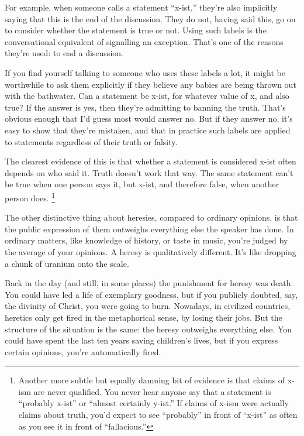 \documentclass[12pt]{book}
\begin{document}
For example, when someone calls a statement ``x-ist,'' they're also
implicitly saying that this is the end of the discussion. They do not,
having said this, go on to consider whether the statement is true or
not. Using such labels is the conversational equivalent of signalling an
exception. That's one of the reasons they're used: to end a discussion.

If you find yourself talking to someone who uses these labels a lot, it
might be worthwhile to ask them explicitly if they believe any babies
are being thrown out with the bathwater. Can a statement be x-ist, for
whatever value of x, and also true? If the answer is yes, then they're
admitting to banning the truth. That's obvious enough that I'd guess
most would answer no. But if they answer no, it's easy to show that
they're mistaken, and that in practice such labels are applied to
statements regardless of their truth or falsity.

The clearest evidence of this is that whether a statement is considered
x-ist often depends on who said it. Truth doesn't work that way. The
same statement can't be true when one person says it, but x-ist, and
therefore false, when another person does. \footnote{Another more subtle but equally damning bit of evidence is that
claims of x-ism are never qualified. You never hear anyone say that a
statement is ``probably x-ist'' or ``almost certainly y-ist.'' If claims
of x-ism were actually claims about truth, you'd expect to see
``probably'' in front of ``x-ist'' as often as you see it in front of
``fallacious.''}

The other distinctive thing about heresies, compared to ordinary
opinions, is that the public expression of them outweighs everything
else the speaker has done. In ordinary matters, like knowledge of
history, or taste in music, you're judged by the average of your
opinions. A heresy is qualitatively different. It's like dropping a
chunk of uranium onto the scale.

Back in the day (and still, in some places) the punishment for heresy
was death. You could have led a life of exemplary goodness, but if you
publicly doubted, say, the divinity of Christ, you were going to burn.
Nowadays, in civilized countries, heretics only get fired in the
metaphorical sense, by losing their jobs. But the structure of the
situation is the same: the heresy outweighs everything else. You could
have spent the last ten years saving children's lives, but if you
express certain opinions, you're automatically fired.
\end{document}
